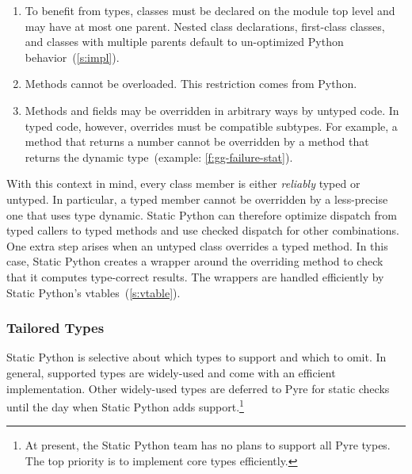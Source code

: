 \documentclass[english,cleveref,submission]{programming}
\newcommand{\SP}{Static Python}
\newcommand{\code}[1]{\texttt{#1}}
\begin{document}
\begin{enumerate}
  \item
    To benefit from types, classes must be declared on the module top level
    and may have at most one parent.
    Nested class declarations, first-class classes, and classes with
    multiple parents default to un-optimized Python behavior~(\cref{s:impl}).

  \item
    Methods cannot be overloaded.
    This restriction comes from Python.

  \item
    Methods and fields may be overridden in arbitrary ways by untyped code.
    In typed code, however, overrides must be compatible subtypes.
    For example, a method that returns a number cannot be overridden by a method
    that returns the dynamic type~(example: \cref{f:gg-failure-stat}).


\end{enumerate}
%
With this context in mind, every class member is either \emph{reliably} typed or untyped.
In particular, a typed member cannot be overridden by a less-precise one that uses
type dynamic.
\SP{} can therefore optimize dispatch from typed callers to typed methods
and use checked dispatch for other combinations.
One extra step arises when an untyped class overrides a typed method.
In this case, \SP{} creates a wrapper around the overriding method to check
that it computes type-correct results.
The wrappers are handled efficiently by \SP{}'s vtables~(\cref{s:vtable}).


\subsubsection{Tailored Types}

\SP{} is selective about which types to support and which to omit.
In general, supported types are widely-used and come with an efficient
implementation.
Other widely-used types are deferred to Pyre for static checks until
the day when \SP{} adds support.\footnote{At present, the \SP{} team
has no plans to support all Pyre types. The top priority is to implement
core types efficiently.}
\end{document}
